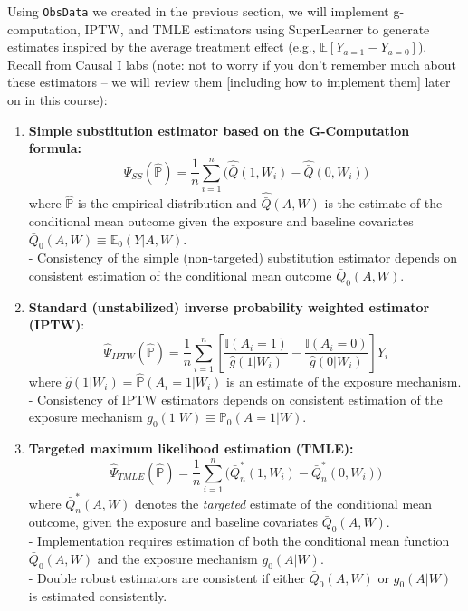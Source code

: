 \documentclass{exam}
\begin{document}
Using \texttt{ObsData} we created in the previous section, we will implement g-computation, IPTW, and TMLE estimators using SuperLearner to generate estimates inspired by the average treatment effect (e.g., $\mathbb{E}[Y_{a=1} - Y_{a=0}]$). Recall from Causal I labs (note: not to worry if you don't remember much about these estimators -- we will review them [including how to implement them] later on in this course):

\begin{enumerate}
\item \textbf{Simple substitution estimator based on the G-Computation formula:} \[
\hat{\Psi}_{SS}(\hat{\mathbb{P}}) = \frac{1}{n} \sum_{i=1}^n  \big( \hat{\bar{Q}}(1, W_i) - \hat{\bar{Q}}(0, W_i) \big)
\]
where $\hat{\mathbb{P}}$ is the empirical distribution and $\hat{\bar{Q}}(A, W)$ is the estimate of the conditional mean outcome given the exposure and baseline covariates $\bar{Q}_0(A,W)\equiv \mathbb{E}_0(Y|A,W)$.\\ 
- Consistency of the simple (non-targeted) substitution estimator depends on consistent estimation of the conditional mean outcome $\bar{Q}_0(A,W)$.\\

\item \textbf{Standard (unstabilized) inverse probability weighted estimator (IPTW)}: 
\[
\hat{\Psi}_{IPTW}(\hat{\mathbb{P}}) = \frac{1}{n}\sum_{i=1}^n \left[ \frac{\mathbb{I}(A_i=1)}{\hat{g}(1|W_i)}  - 
   \frac{\mathbb{I}(A_i=0)}{\hat{g}(0|W_i)} \right] Y_i
\]
where $\hat{g}(1|W_i) = \hat{\mathbb{P}}(A_i=1|W_i)$ is an estimate of the exposure mechanism.\\
- Consistency of IPTW estimators depends on consistent estimation of the exposure mechanism $g_0(1|W) \equiv \mathbb{P}_0(A=1|W)$. \\

\item \textbf{Targeted maximum likelihood estimation (TMLE):}\[
\hat{\Psi}_{TMLE}(\hat{\mathbb{P}}) =  \frac{1}{n} \sum_{i=1}^n \big( \bar{Q}^*_n(1, W_i) - \bar{Q}^*_n(0, W_i) \big)
\]
where $\bar{Q}^*_n(A, W)$ denotes the \textit{targeted} estimate of the conditional mean outcome, given the exposure and baseline covariates $\bar{Q}_0(A,W)$.\\
- Implementation requires estimation of both the conditional mean function $\bar{Q}_0(A,W)$ and the exposure mechanism $g_0(A|W)$. \\
- Double robust estimators are consistent if {either} $\bar{Q}_0(A,W)$ {or} $g_0(A|W)$ is estimated consistently. \\
\end{enumerate}
\end{document}
